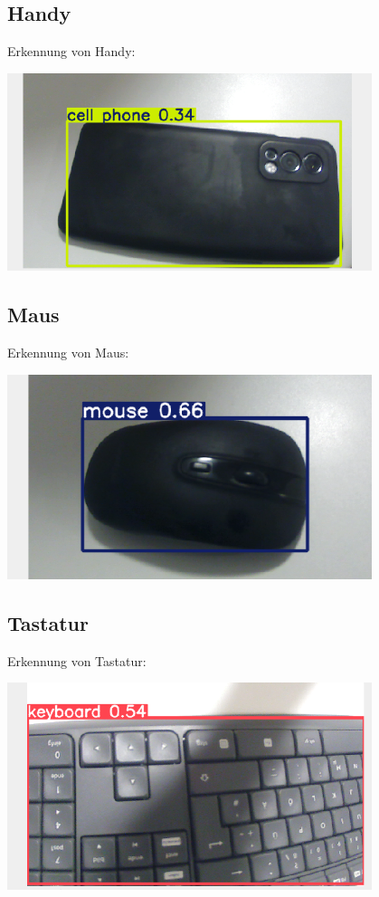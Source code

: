 \documentclass{article}
\begin{document}
\subsection{Handy}
Erkennung von Handy: 

\begin{center}
    \includegraphics[width=0.8\textwidth]{Bilder/handyErkennung.png}
\end{center}

\subsection{Maus}
Erkennung von Maus:

\begin{center}
    \includegraphics[width=0.8\textwidth]{Bilder/mausErkennung.png}
\end{center}

\subsection{Tastatur}
Erkennung von Tastatur: 

\begin{center}
    \includegraphics[width=0.8\textwidth]{Bilder/tastaturErkennung.png}
\end{center}
\end{document}
